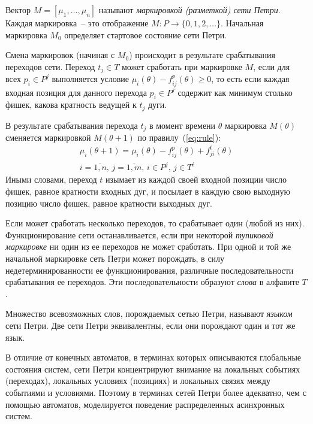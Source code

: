 Вектор ${M = [\mu_1, \dots, \mu_n]}$ называют \textit{маркировкой (разметкой) сети Петри}. Каждая маркировка~-- это отображение ${M\colon P\rightarrow \{0, 1, 2, \dots \}}$. Начальная маркировка $M_0$ определяет стартовое состояние сети Петри.

Смена маркировок (начиная с $M_0$) происходит в результате срабатывания переходов сети. Переход ${t_j\in T}$ может сработать при маркировке $M$, если для всех ${p_i\in P^j}$ выполняется условие ${\mu_i(\theta) - f_{ij}^p(\theta)\geqslant 0}$, то есть если каждая входная позиция для данного перехода ${p_i\in P^j}$ содержит как минимум столько фишек, какова кратность ведущей к $t_j$ дуги.

В результате срабатывания перехода $t_j$ в момент времени $\theta$ маркировка $M(\theta)$ сменяется маркировкой $M(\theta + 1)$ по правилу~(\ref{eq:rule}):
%
\begin{equation}
    \label{eq:rule}
    \begin{gathered}
        \mu_i(\theta + 1) = \mu_i(\theta) - f_{ij}^p(\theta) + f_{ji}^t(\theta)\\
        i = \overline{1, n},\, j = \overline{1, m},\, i\in P^j,\, j\in T^i
    \end{gathered}
\end{equation}
%
Иными словами, переход $t$ изымает из каждой своей входной позиции число фишек, равное кратности входных дуг, и посылает в каждую свою выходную позицию число фишек, равное кратности выходных дуг.

Если может сработать несколько переходов, то срабатывает один (любой из них). Функционирование сети останавливается, если при некоторой \textit{тупиковой маркировке} ни один из ее переходов не может сработать. При одной и той же начальной маркировке сеть Петри может порождать, в силу недетерминированности ее функционирования, различные последовательности срабатывания ее переходов. Эти последовательности образуют \textit{слова} в алфавите $T$.

Множество всевозможных слов, порождаемых сетью Петри, называют \textit{языком} сети Петри. Две сети Петри эквивалентны, если они порождают один и тот же язык.

В отличие от конечных автоматов, в терминах которых описываются глобальные состояния систем, сети Петри концентрируют внимание на локальных событиях (переходах), локальных условиях (позициях) и локальных связях между событиями и условиями. Поэтому в терминах сетей Петри более адекватно, чем с помощью автоматов, моделируется поведение распределенных асинхронных систем.

